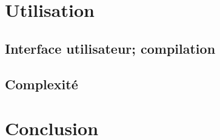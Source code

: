 \documentclass{article}
\begin{document}


\section{Utilisation}

\subsection{Interface utilisateur; compilation}

\subsection{Complexité}

\section*{Conclusion}



\end{document}
